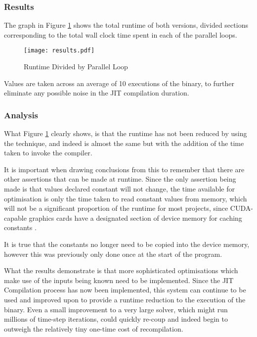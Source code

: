 \subsubsection{Results}
The graph in Figure \ref{fig:res} shows the total runtime of both versions, divided sections corresponding to the total wall clock time spent in each of the parallel loops.

\begin{figure}[h!]
\begin{center}
\caption{Runtime Divided by Parallel Loop}
\label{fig:res}
\texttt{[image: results.pdf]}
\end{center}
\vspace{-1cm}
\end{figure}

\noindent Values are taken across an average of 10 executions of the binary, to further eliminate any possible noise in the JIT compilation duration.

\subsubsection{Analysis}
What Figure \ref{fig:res} clearly shows, is that the runtime has not been reduced by using the technique, and indeed is almost the same but with the addition of the time taken to invoke the compiler.
\par
It is important when drawing conclusions from this to remember that there are other assertions that can be made at runtime. Since the only assertion being made is that values declared constant will not change, the time available for optimisation is only the time taken to read constant values from memory, which will not be a significant proportion of the runtime for most projects, since CUDA-capable graphics cards have a designated section of device memory for caching constants \cite[p73]{guide}.
\par
It is true that the constants no longer need to be copied into the device memory, however this was previously only done once at the start of the program.
\par
What the results demonstrate is that more sophisticated optimisations which make use of the inputs being known need to be implemented. Since the JIT Compilation process has now been implemented, this system can continue to be used and improved upon to provide a runtime reduction to the execution of the binary. Even a small improvement to a very large solver, which might run millions of time-step iterations, could quickly re-coup and indeed begin to outweigh the relatively tiny one-time cost of recompilation.

